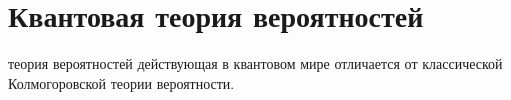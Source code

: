 \section{Квантовая теория вероятностей}

теория вероятностей действующая в квантовом мире отличается от
классической Колмогоровской теории вероятности.
